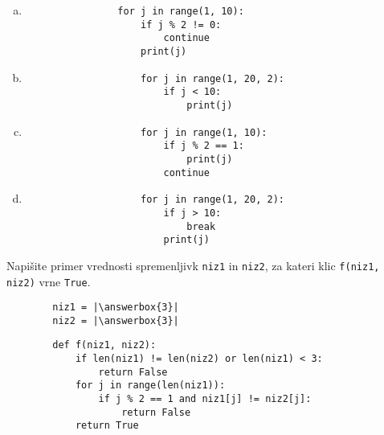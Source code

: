 \documentclass[arhiv, 10pt]{../izpit}
\newcommand{\inlinepy}[1]{\texttt{#1}}
\newcommand{\answerbox}[1]{\framebox{\vphantom{\large M}\hspace{#1cm}}}
\begin{document}
        \begin{multicols}{2}
        \begin{enumerate}[(a)]
\item 
            \begin{verbatim}
                for j in range(1, 10):
                    if j % 2 != 0:
                        continue
                    print(j)
            \end{verbatim}
        
\item 
                \begin{verbatim}
                    for j in range(1, 20, 2):
                        if j < 10:
                            print(j)
                \end{verbatim}
            
\item 
                \begin{verbatim}
                    for j in range(1, 10):
                        if j % 2 == 1:
                            print(j)
                        continue
                \end{verbatim}
            
\item 
                \begin{verbatim}
                    for j in range(1, 20, 2):
                        if j > 10:
                            break
                        print(j)
                \end{verbatim}
            
\end{enumerate}

        \end{multicols}
    
        \naloga*
        \begin{multicols}{2}
        \noindent
        Napišite primer vrednosti spremenljivk \inlinepy{niz1} in \inlinepy{niz2}, za kateri klic \inlinepy{f(niz1, niz2)} vrne \inlinepy{True}.
        \begin{verbatim}
        niz1 = |\answerbox{3}|
        niz2 = |\answerbox{3}|
        \end{verbatim}
        \vfil
        \columnbreak
        \begin{verbatim}
        def f(niz1, niz2):
            if len(niz1) != len(niz2) or len(niz1) < 3:
                return False
            for j in range(len(niz1)):
                if j % 2 == 1 and niz1[j] != niz2[j]:
                    return False
            return True
        \end{verbatim}
        \end{multicols}
    
\end{document}
